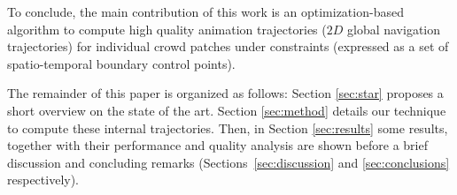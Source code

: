 To conclude, the main contribution of this work is an optimization-based algorithm to compute high quality animation trajectories ($2D$ global navigation trajectories) for individual crowd patches under constraints (expressed as a set of spatio-temporal boundary control points).

The remainder of this paper is organized as follows: Section \ref{sec:star} proposes a short overview on the state of the art. Section \ref{sec:method} details our technique to compute these internal trajectories. Then, in Section \ref{sec:results} some results, together with their performance and quality analysis are shown before a brief discussion and concluding remarks (Sections~\ref{sec:discussion} and \ref{sec:conclusions} respectively). 
